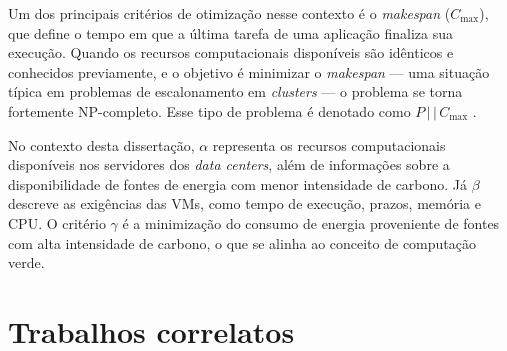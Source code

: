 \documentclass[
	12pt,				%
	oneside,			%
	a4paper,			%
	english,			%
	brazil				%
	]{abntex2ppgsi}
\begin{document}
Um dos principais critérios de otimização nesse contexto é o \textit{makespan} ($C_{\max}$), que define o tempo em que a última tarefa de uma aplicação finaliza sua execução. Quando os recursos computacionais disponíveis são idênticos e conhecidos previamente, e o objetivo é minimizar o \textit{makespan} --- uma situação típica em problemas de escalonamento em \textit{clusters} --- o problema se torna fortemente NP-completo. Esse tipo de problema é denotado como $P\,\vert\,\vert\,C_{\max}$ \cite{GRAHAM1979287}.

No contexto desta dissertação, $\alpha$ representa os recursos computacionais disponíveis nos servidores dos \textit{data centers}, além de informações sobre a disponibilidade de fontes de energia com menor intensidade de carbono. Já $\beta$ descreve as exigências das VMs, como tempo de execução, prazos, memória e CPU. O critério $\gamma$ é a minimização do consumo de energia proveniente de fontes com alta intensidade de carbono, o que se alinha ao conceito de computação verde.

\chapter{Trabalhos correlatos}\label{chapter:trabalhos-correlatos}

\postextual



%
%

\end{document}
